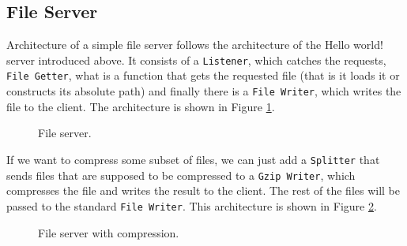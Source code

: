 \documentclass[12pt,a4paper]{article}
\begin{document}
\subsection{File Server}
Architecture of a simple file server follows the architecture of the Hello world!
server introduced above. It consists of a \texttt{Listener}, which catches the requests,
\texttt{File Getter}, what is a function that gets the requested file (that is it loads it or 
constructs its absolute path) and finally there is a \texttt{File Writer}, which
writes the file to the client. The architecture is shown in Figure \ref{fig:fileServer}.
\\
\begin{figure}[h]
\centering
{}
\caption[scale=1.0]{File server.}
\label{fig:fileServer}
\end{figure}

If we want to compress some subset of files, we can just add a \texttt{Splitter}
that sends files that are supposed to be compressed to a \texttt{Gzip Writer}, which
compresses the file and writes the result to the client. The rest of the files
will be passed to the standard \texttt{File Writer}. This architecture is shown in
Figure \ref{fig:fileServer2}.

\begin{figure}[h]
\centering
{}
\caption[scale=1.0]{File server with compression.}
\label{fig:fileServer2}
\end{figure}
\end{document}

